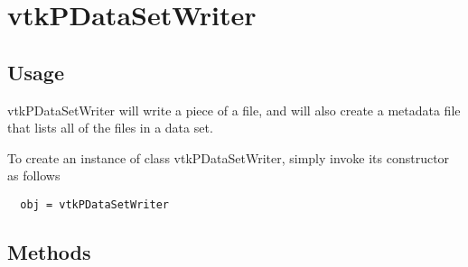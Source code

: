 \section{vtkPDataSetWriter}

\subsection{Usage}

 vtkPDataSetWriter will write a piece of a file, and will also create
 a metadata file that lists all of the files in a data set.

To create an instance of class vtkPDataSetWriter, simply
invoke its constructor as follows
\begin{verbatim}
  obj = vtkPDataSetWriter
\end{verbatim}
\subsection{Methods}

